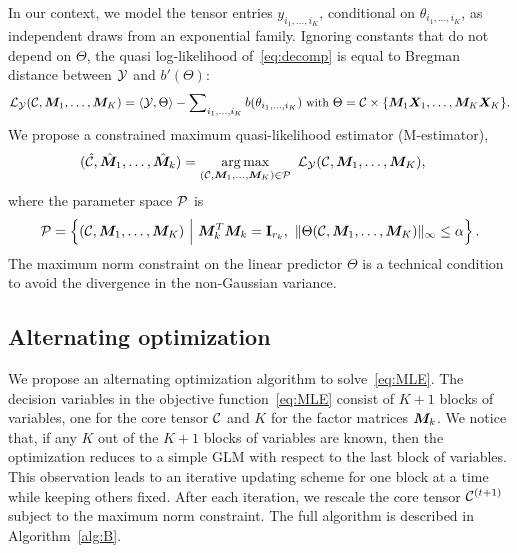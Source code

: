 \documentclass[12pt]{article}
\theoremstyle{definition}
\theoremstyle{definition}
\begin{document}
In our context, we model the tensor entries $y_{i_1,\ldots,i_K}$, conditional on $\theta_{i_1,\ldots,i_K}$, as independent draws from an exponential family. Ignoring constants that do not depend on $\Theta$, the quasi log-likelihood of~\eqref{eq:decomp} is equal to Bregman distance between $\mathcal{Y}$ and $b'(\Theta)$:
\begin{equation}\label{eq:loglikelihood}
\small
\tL_{\tY}(\tC,\mM_1,\ldots,\mM_K)=\langle \tY, \Theta \rangle - \sum\nolimits_{i_1,\ldots,i_K} b(\theta_{i_1,\ldots,i_K})\ \text{with}\ \Theta=\tC\times\{\mM_1\mX_1,\ldots,\mM_K\mX_K\}.
\end{equation}
We propose a constrained maximum quasi-likelihood estimator (M-estimator),
\begin{align} \label{eq:MLE} 
(\hat \tC, \hat \mM_1,\ldots,\hat \mM_k) &=\argmax_{(\tC,\mM_1,\ldots,\mM_K)\in \tP} \ \tL_{\tY}(\tC,\mM_1,\ldots,\mM_K),
\end{align}
where the parameter space $\mathcal{P}$ is
\[
\tP=\left\{(\tC, \mM_1,\ldots,\mM_K) \ \Big| \ \mM_k^T\mM_k=\mathbf{I}_{r_k},\ \mnormSize{}{\Theta(\tC,\mM_1,\ldots,\mM_K)}\leq \alpha \right\}.
\]
The maximum norm constraint on the linear predictor $\Theta$ is a technical condition to avoid the divergence in the non-Gaussian variance.


\subsection{Alternating optimization} \label{subsec:alg}
We propose an alternating optimization algorithm to solve~\eqref{eq:MLE}. 
The decision variables in the objective function~\eqref{eq:MLE} consist of $K+1$ blocks of variables, one for the core tensor $\mathcal{C}$ and $K$ for the factor matrices $\bm M_k$. We notice that, if any $K$ out of the $K+1$ blocks of variables are known, then the optimization reduces to a simple GLM with respect to the last block of variables. This observation leads to an iterative updating scheme for one block at a time while keeping others fixed. After each iteration, we rescale the core tensor $\mathcal{C}^{(t+1)}$ subject to the maximum norm constraint. The full algorithm is described in Algorithm~\ref{alg:B}. 
\end{document}
